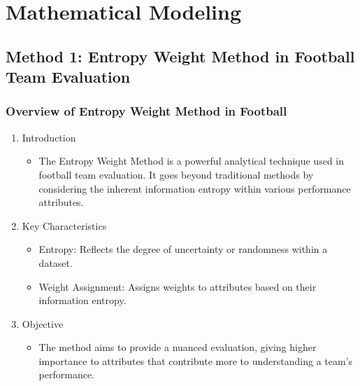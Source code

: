 \documentclass{beamer}
\begin{document}
% 
% 
% 
% 
\section{Mathematical Modeling}
% 
% 
% 
% 
\subsection{Method 1: Entropy Weight Method in Football Team Evaluation}
\begin{frame}
  \frametitle{Overview of Entropy Weight Method in Football}
  \begin{enumerate}
    \item Introduction
          \begin{itemize}
            \item The Entropy Weight Method is a powerful analytical technique used in football team evaluation. It goes beyond traditional methods by considering the inherent information entropy within various performance attributes.
          \end{itemize}
    \item Key Characteristics
          \begin{itemize}
            \item Entropy: Reflects the degree of uncertainty or randomness within a dataset.
            \item Weight Assignment: Assigns weights to attributes based on their information entropy.

          \end{itemize}
    \item Objective
          \begin{itemize}
            \item The method aims to provide a nuanced evaluation, giving higher importance to attributes that contribute more to understanding a team's performance.
          \end{itemize}
  \end{enumerate}


\end{frame}
% 
% 
% 
% 
\end{document}
